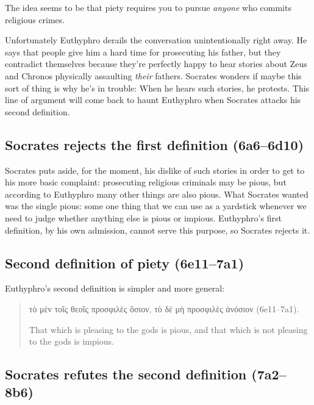 \documentclass[11pt]{article}
\begin{document}
The idea seems to be that piety requires you to pursue \emph{anyone} who
commits religious crimes.

Unfortunately Euthyphro derails the conversation unintentionally right
away.  He says that people give him a hard time for prosecuting his father,
but they contradict themselves because they're perfectly happy to hear
stories about Zeus and Chronos physically assaulting \emph{their} fathers.
Socrates wonders if maybe this sort of thing is why he's in trouble: When
he hears such stories, he protests.  This line of argument will come back
to haunt Euthyphro when Socrates attacks his second definition.


\subsection{Socrates rejects the first definition (6a6--6d10)}

Socrates puts aside, for the moment, his dislike of such stories in order
to get to his more basic complaint: prosecuting religious criminals may be
pious, but according to Euthyphro many other things are also pious.  What
Socrates wanted was the single pious: some one thing that we can use as
a yardstick whenever we need to judge whether anything else is pious or
impious.  Euthyphro's first definition, by his own admission, cannot serve
this purpose, so Socrates rejects it.


\subsection{Second definition of piety (6e11--7a1)}

Euthyphro's second definition is simpler and more general:

\begin{quote}

    {\g
    τὸ μὲν τοῖς θεοῖς προσφιλὲς ὅσιον, τὸ δὲ μὴ προσφιλὲς ἀνόσιον
    } (6e11--7a1).

    That which is pleasing to the gods is pious, and that which is not
    pleasing to the gods is impious.

\end{quote}

\subsection{Socrates refutes the second definition (7a2--8b6)}
\end{document}
